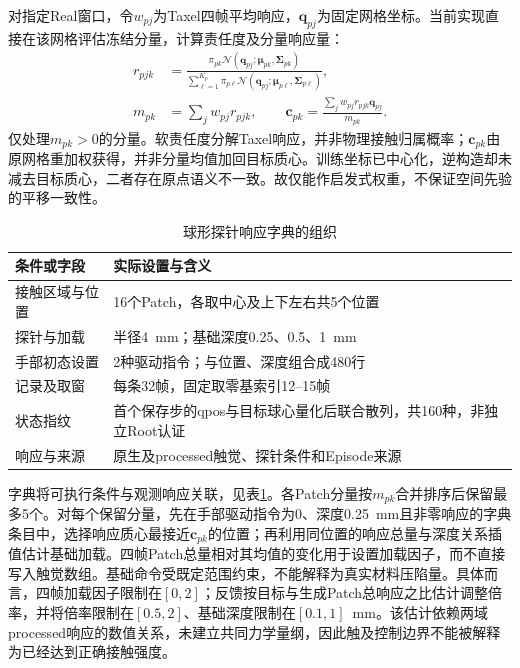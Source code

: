 对指定Real窗口，令$w_{pj}$为Taxel四帧平均响应，$\boldsymbol q_{pj}$为固定网格坐标。当前实现直接在该网格评估冻结分量，计算责任度及分量响应量：
\begin{equation}
 \begin{aligned}
 r_{pjk}&=\frac{\pi_{pk}\mathcal N(\boldsymbol q_{pj};\boldsymbol\mu_{pk},\boldsymbol\Sigma_{pk})}
 {\sum_{\ell=1}^{K_p}\pi_{p\ell}\mathcal N(\boldsymbol q_{pj};\boldsymbol\mu_{p\ell},\boldsymbol\Sigma_{p\ell})},\\
 m_{pk}&=\sum_j w_{pj}r_{pjk},\qquad
 \boldsymbol c_{pk}=\frac{\sum_j w_{pj}r_{pjk}\boldsymbol q_{pj}}{m_{pk}}.
 \end{aligned}
 \label{eq:ch05_gmm_responsibility}
\end{equation}
仅处理$m_{pk}>0$的分量。软责任度分解Taxel响应，并非物理接触归属概率；$\boldsymbol c_{pk}$由原网格重加权获得，并非分量均值加回目标质心。训练坐标已中心化，逆构造却未减去目标质心，二者存在原点语义不一致。故仅能作启发式权重，不保证空间先验的平移一致性。

\begin{table}[htbp]
 \centering\small
 \caption{球形探针响应字典的组织}
 \label{tab:ch05_probe_dictionary}
 \begin{tabular}{p{}p{}}
 \hline
 条件或字段 & 实际设置与含义\\
 \hline
 接触区域与位置 & 16个Patch，各取中心及上下左右共5个位置\\
 探针与加载 & 半径4~mm；基础深度0.25、0.5、1~mm\\
 手部初态设置 & 2种驱动指令；与位置、深度组合成480行\\
 记录及取窗 & 每条32帧，固定取零基索引12--15帧\\
 状态指纹 & 首个保存步的qpos与目标球心量化后联合散列，共160种，非独立Root认证\\
 响应与来源 & 原生及processed触觉、探针条件和Episode来源\\
 \hline
 \end{tabular}
\end{table}

字典将可执行条件与观测响应关联，见表\ref{tab:ch05_probe_dictionary}。各Patch分量按$m_{pk}$合并排序后保留最多5个。对每个保留分量，先在手部驱动指令为0、深度0.25~mm且非零响应的字典条目中，选择响应质心最接近$\boldsymbol c_{pk}$的位置；再利用同位置的响应总量与深度关系插值估计基础加载。四帧Patch总量相对其均值的变化用于设置加载因子，而不直接写入触觉数组。基础命令受既定范围约束，不能解释为真实材料压陷量。具体而言，四帧加载因子限制在$[0,2]$；反馈按目标与生成Patch总响应之比估计调整倍率，并将倍率限制在$[0.5,2]$、基础深度限制在$[0.1,1]$~mm。该估计依赖两域processed响应的数值关系，未建立共同力学量纲，因此触及控制边界不能被解释为已经达到正确接触强度。


